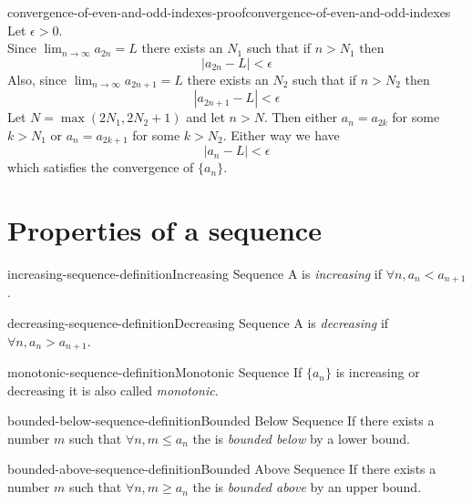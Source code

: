 \documentclass[preview]{standalone}
\begin{document}
\begin{snippetproof}{convergence-of-even-and-odd-indexes-proof}{convergence-of-even-and-odd-indexes}{}
    Let \(\epsilon>0\). \\
    Since \(\lim_{n\to\infty}a_{2n}=L\) there exists an \(N_1\) such that
    if \(n>N_1\) then
    \[
        |a_{2n}-L|<\epsilon
    \]
    Also, since \(\lim_{n\to\infty}a_{2n+1}=L\) there exists an \(N_2\) such that
    if \(n>N_2\) then
    \[
        |a_{2n+1}-L|<\epsilon
    \]
    Let \(N=\max(2N_1, 2N_2+1)\) and let \(n>N\).
    Then either \(a_n=a_{2k}\) for some \(k>N_1\) or \(a_n=a_{2k+1}\)
    for some \(k>N_2\). Either way we have
    \[
        |a_n-L|<\epsilon
    \]
    which satisfies the convergence of \(\{a_n\}\).
\end{snippetproof}

\section{Properties of a sequence}

\begin{snippetdefinition}{increasing-sequence-definition}{Increasing Sequence}
    A \sequence is \textit{increasing} if \(\forall n, a_n<a_{n+1}\).
\end{snippetdefinition}

\begin{snippetdefinition}{decreasing-sequence-definition}{Decreasing Sequence}
    A \sequence is \textit{decreasing} if \(\forall n, a_n>a_{n+1}\).
\end{snippetdefinition}

\begin{snippetdefinition}{monotonic-sequence-definition}{Monotonic Sequence}
    If \(\{a_n\}\) is increasing or decreasing it is also called \textit{monotonic}.
\end{snippetdefinition}

\begin{snippetdefinition}{bounded-below-sequence-definition}{Bounded Below Sequence}
    If there exists a number \(m\) such that \(\forall n, m \leq a_n\)
    the \sequence is \textit{bounded below} by a lower bound.
\end{snippetdefinition}

\begin{snippetdefinition}{bounded-above-sequence-definition}{Bounded Above Sequence}
    If there exists a number \(m\) such that \(\forall n, m \geq a_n\)
    the \sequence is \textit{bounded above} by an upper bound.
\end{snippetdefinition}
\end{document}
